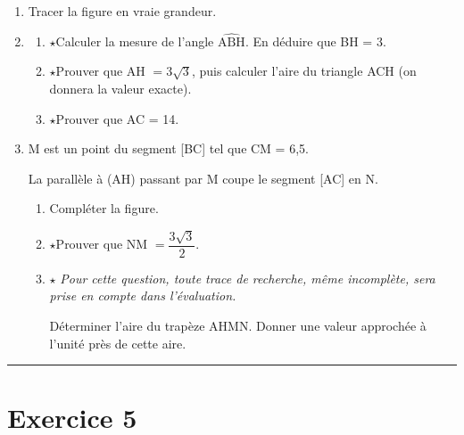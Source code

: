 \documentclass[11pt,a4paper]{article}
\newcommand{\horsprog}{\textbf{\large $\star$}\;}
\newcommand{\separation}{%
    \vspace{0.4cm}
    \hrule
    \vspace{0.7cm}
}
\begin{document}
\begin{enumerate}

\item Tracer la figure en vraie grandeur.

\item
    \begin{enumerate}

    \item \horsprog Calculer la mesure de l'angle
    $\widehat{\text{ABH}}$. En déduire que BH = 3.

    \item \horsprog Prouver que AH $= 3\sqrt{3}$, puis calculer
    l'aire du triangle ACH (on donnera la valeur exacte).

    \item \horsprog Prouver que AC = 14.

    \end{enumerate}

\item M est un point du segment [BC] tel que CM = 6,5.

La parallèle à (AH) passant par M coupe le segment [AC] en N.

    \begin{enumerate}

    \item Compléter la figure.

    \item \horsprog Prouver que
    NM $= \dfrac{3\sqrt{3}}{2}$.

    \item \horsprog
    \emph{Pour cette question, toute trace de recherche, même
    incomplète, sera prise en compte dans l'évaluation.}

    \medskip

    Déterminer l'aire du trapèze AHMN. Donner une valeur approchée
    à l'unité près de cette aire.

    \end{enumerate}

\end{enumerate}


\separation



\section*{Exercice 5}
\end{document}
